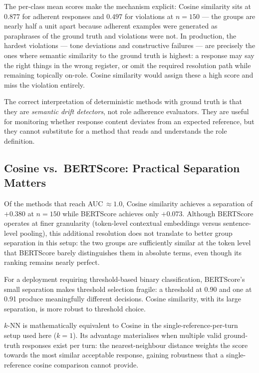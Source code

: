 \documentclass[11pt,a4paper]{article}
\begin{document}
The per-class mean scores make the mechanism explicit: Cosine similarity
sits at $0.877$ for adherent responses and $0.497$ for violations at $n = 150$
--- the groups are nearly half a unit apart because adherent examples were
generated as paraphrases of the ground truth and violations were not. In
production, the hardest violations --- tone deviations and constructive
failures --- are precisely the ones where semantic similarity to the ground
truth is highest: a response may say the right things in the wrong register, or
omit the required resolution path while remaining topically on-role. Cosine
similarity would assign these a high score and miss the violation entirely.

The correct interpretation of deterministic methods with ground truth is that
they are \emph{semantic drift detectors}, not role adherence evaluators. They
are useful for monitoring whether response content deviates from an expected
reference, but they cannot substitute for a method that reads and understands
the role definition.

\subsection{Cosine vs.\ BERTScore: Practical Separation Matters}

Of the methods that reach AUC\,$\approx 1.0$, Cosine similarity achieves a
separation of $+0.380$ at $n = 150$ while BERTScore achieves only $+0.073$.
Although BERTScore operates at finer granularity (token-level contextual
embeddings versus sentence-level pooling), this additional resolution does not
translate to better group separation in this setup: the two groups are
sufficiently similar at the token level that BERTScore barely distinguishes
them in absolute terms, even though its ranking remains nearly perfect.

For a deployment requiring threshold-based binary classification, BERTScore's
small separation makes threshold selection fragile: a threshold at 0.90 and
one at 0.91 produce meaningfully different decisions. Cosine similarity, with
its large separation, is more robust to threshold choice.

$k$-NN is mathematically equivalent to Cosine in the single-reference-per-turn
setup used here ($k = 1$). Its advantage materialises when multiple valid
ground-truth responses exist per turn: the nearest-neighbour distance weights
the score towards the most similar acceptable response, gaining robustness that
a single-reference cosine comparison cannot provide.
\end{document}
